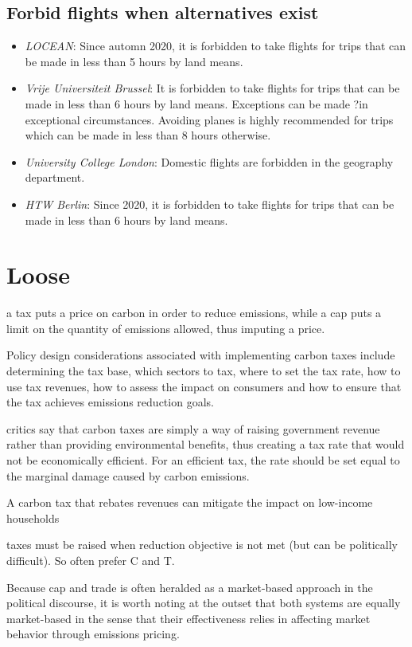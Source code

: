 \documentclass[version=3.21, pagesize, twoside=off, bibliography=totoc, DIV=calc, fontsize=12pt, a4paper, french, english]{scrartcl}
\begin{document}
\subsection{Forbid flights when alternatives exist}
\begin{itemize}
\item \emph{LOCEAN}: Since automn 2020, it is forbidden to take flights for trips that can be made in less than 5 hours by land means. 
\item \emph{Vrije Universiteit Brussel}: It is forbidden to take flights for trips that can be made in less than 6 hours by land means. Exceptions can be made ?in exceptional circumstances. Avoiding planes is highly recommended for trips which can be made in less than 8 hours otherwise. 
\item \emph{University College London}: Domestic flights are forbidden in the geography department. 
\item \emph{HTW Berlin}: Since 2020, it is forbidden to take flights for trips that can be made in less than 6 hours by land means.
\end{itemize}

\section{Loose}
a tax puts a price on carbon in order to reduce emissions, while a cap puts a limit on the quantity of emissions allowed, thus imputing a price.

Policy design considerations associated with implementing carbon taxes
include determining the tax base, which sectors to tax, where to set the tax rate, how to use tax
revenues, how to assess the impact on consumers and how to ensure that the tax achieves emissions
reduction goals.

critics say that carbon taxes are simply a way of raising government
revenue rather than providing environmental benefits, thus creating a tax rate that would not be economically efficient. For an efficient tax, the rate should be set equal to the marginal damage caused by
carbon emissions.

A carbon tax that rebates revenues can mitigate the impact on low-income households

taxes must be raised when reduction objective is not met (but can be politically difficult). So often prefer C and T.

Because cap and trade is often heralded as a market-based approach in the
political discourse, it is worth noting at the outset that both systems are equally market-based in
the sense that their effectiveness relies in affecting market behavior through emissions pricing.
\end{document}
